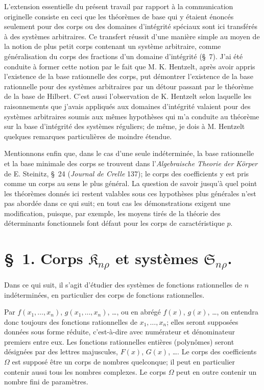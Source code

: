 \documentclass[11pt]{article}
\providecommand{\Kfield}{\mathfrak{K}}
\providecommand{\Ssys}{\mathfrak{S}}
\begin{document}
L'extension essentielle du présent travail par rapport à la communication originelle consiste en ceci que les théorèmes de base qui y étaient énoncés seulement pour des corps ou des domaines d’intégrité spéciaux sont ici transférés à des systèmes arbitraires. Ce transfert réussit d'une manière simple au moyen de la notion de plus petit corps contenant un système arbitraire, comme généralisation du corps des fractions d'un domaine d’intégrité (\S\ 7). J'ai été conduite à former cette notion par le fait que M. K. Hentzelt, après avoir appris l'existence de la base rationnelle des corps, put démontrer l'existence de la base rationnelle pour des systèmes arbitraires par un détour passant par le théorème de la base de Hilbert. C'est aussi l'observation de K. Hentzelt selon laquelle les raisonnements que j'avais appliqués aux domaines d’intégrité valaient pour des systèmes arbitraires soumis aux mêmes hypothèses qui m'a conduite au théorème sur la base d'intégrité des systèmes réguliers; de même, je dois à M. Hentzelt quelques remarques particulières de moindre étendue.

Mentionnons enfin que, dans le cas d'une seule indéterminée, la base rationnelle et la base minimale des corps se trouvent dans l'\emph{Algebraische Theorie der Körper} de E. Steinitz, \S\ 24 (\emph{Journal de Crelle} 137); le corps des coefficients y est pris comme un corps au sens le plus général. La question de savoir jusqu'à quel point les théorèmes donnés ici restent valables sous ces hypothèses plus générales n'est pas abordée dans ce qui suit; en tout cas les démonstrations exigent une modification, puisque, par exemple, les moyens tirés de la théorie des déterminants fonctionnels font défaut pour les corps de caractéristique $p$.

\section*{\S\ 1. Corps $\Kfield_{n\rho}$ et systèmes $\Ssys_{n\rho}$.}

Dans ce qui suit, il s'agit d'étudier des systèmes de fonctions rationnelles de $n$ indéterminées, en particulier des corps de fonctions rationnelles.

Par $f(x_1,\ldots,x_n)$, $g(x_1,\ldots,x_n)$, \ldots, ou en abrégé $f(x)$, $g(x)$, \ldots, on entendra donc toujours des fonctions rationnelles de $x_1,\ldots,x_n$; elles seront supposées données sous forme réduite, c'est-à-dire avec numérateur et dénominateur premiers entre eux. Les fonctions rationnelles entières (polynômes) seront désignées par des lettres majuscules, $F(x)$, $G(x)$, \ldots. Le corps des coefficients $\Omega$ est supposé être un corps de nombres quelconque; il peut en particulier contenir aussi tous les nombres complexes. Le corps $\Omega$ peut en outre contenir un nombre fini de paramètres.
\end{document}
